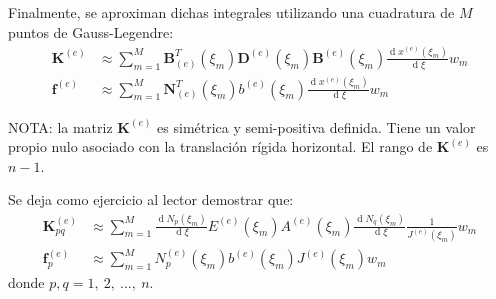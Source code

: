 \documentclass[12pt,letterpaper]{article}
\newcommand{\ma}[1]{{\boldsymbol{#1}}}
\newcommand{\dd}{\operatorname{d} \!}
\begin{document}
Finalmente, se aproximan dichas integrales utilizando una cuadratura de $M$ puntos de Gauss-Legendre:
\begin{align}
\ma{K}^{(e)} &\approx \sum_{m=1}^M \ma{B}_{(e)}^T(\xi_m) \ma{D}^{(e)}(\xi_m) \ma{B}^{(e)}(\xi_m) \frac{\dd x^{(e)}(\xi_m)}{\dd \xi} w_m\\
\ma{f}^{(e)} &\approx \sum_{m=1}^M  \ma{N}_{(e)}^T(\xi_m) b^{(e)}(\xi_m) \frac{\dd x^{(e)}(\xi_m)}{\dd \xi} w_m
\end{align}

NOTA: la matriz $\ma{K}^{(e)}$ es simétrica y semi-positiva definida. Tiene un valor propio nulo asociado con la translación rígida horizontal. El rango de $\ma{K}^{(e)}$ es $n-1$.

Se deja como ejercicio al lector demostrar que:
\begin{align}
\ma{K}^{(e)}_{pq} &\approx \sum_{m=1}^M \frac{\dd N_p(\xi_m)}{\dd \xi} E^{(e)}(\xi_m) A^{(e)}(\xi_m) \frac{\dd N_q(\xi_m)}{\dd \xi} \frac{1}{J^{(e)}(\xi_m)} w_m\\
\ma{f}^{(e)}_p &\approx \sum_{m=1}^M  N_p^{(e)}(\xi_m) b^{(e)}(\xi_m) J^{(e)}(\xi_m) w_m
\end{align}
donde $p, q = 1,\ 2, \ \ldots,\ n$.
\end{document}
